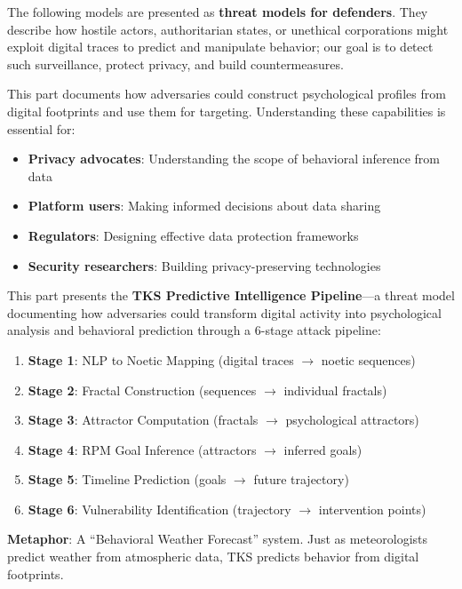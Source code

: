 \documentclass[11pt,twoside]{book}
\theoremstyle{definition}
\theoremstyle{plain}
\theoremstyle{remark}
\begin{document}
\begin{tcolorbox}[colback=red!5!white,colframe=red!75!black,title=\textbf{THREAT MODEL NOTICE},breakable]
The following models are presented as \textbf{threat models for defenders}. They describe how hostile actors, authoritarian states, or unethical corporations might exploit digital traces to predict and manipulate behavior; our goal is to detect such surveillance, protect privacy, and build countermeasures.

This part documents how adversaries could construct psychological profiles from digital footprints and use them for targeting. Understanding these capabilities is essential for:
\begin{itemize}
    \item \textbf{Privacy advocates}: Understanding the scope of behavioral inference from data
    \item \textbf{Platform users}: Making informed decisions about data sharing
    \item \textbf{Regulators}: Designing effective data protection frameworks
    \item \textbf{Security researchers}: Building privacy-preserving technologies
\end{itemize}
\end{tcolorbox}

\begin{tcolorbox}[colback=blue!5!white,colframe=blue!75!black,title=\textbf{Part Overview},breakable]
This part presents the \textbf{TKS Predictive Intelligence Pipeline}---a threat model documenting how adversaries could transform digital activity into psychological analysis and behavioral prediction through a 6-stage attack pipeline:

\begin{enumerate}
    \item \textbf{Stage 1}: NLP to Noetic Mapping (digital traces $\to$ noetic sequences)
    \item \textbf{Stage 2}: Fractal Construction (sequences $\to$ individual fractals)
    \item \textbf{Stage 3}: Attractor Computation (fractals $\to$ psychological attractors)
    \item \textbf{Stage 4}: RPM Goal Inference (attractors $\to$ inferred goals)
    \item \textbf{Stage 5}: Timeline Prediction (goals $\to$ future trajectory)
    \item \textbf{Stage 6}: Vulnerability Identification (trajectory $\to$ intervention points)
\end{enumerate}

\textbf{Metaphor}: A ``Behavioral Weather Forecast'' system. Just as meteorologists predict weather from atmospheric data, TKS predicts behavior from digital footprints.
\end{tcolorbox}
\end{document}
